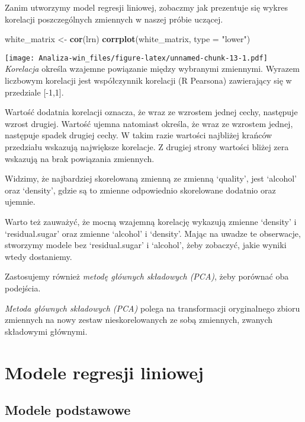 \documentclass[
]{article}
\newenvironment{Shaded}{\begin{snugshade}}{\end{snugshade}}
\newcommand{\AttributeTok}[1]{\textcolor[rgb]{0.13,0.29,0.53}{#1}}
\newcommand{\FunctionTok}[1]{\textcolor[rgb]{0.13,0.29,0.53}{\textbf{#1}}}
\newcommand{\NormalTok}[1]{#1}
\newcommand{\OtherTok}[1]{\textcolor[rgb]{0.56,0.35,0.01}{#1}}
\newcommand{\StringTok}[1]{\textcolor[rgb]{0.31,0.60,0.02}{#1}}
\begin{document}
Zanim utworzymy model regresji liniowej, zobaczmy jak prezentuje się
wykres korelacji poszczególnych zmiennych w naszej próbie uczącej.

\begin{Shaded}
\begin{Highlighting}[]
\NormalTok{white\_matrix }\OtherTok{\textless{}{-}} \FunctionTok{cor}\NormalTok{(lrn)}
\FunctionTok{corrplot}\NormalTok{(white\_matrix, }\AttributeTok{type =} \StringTok{"lower"}\NormalTok{)}
\end{Highlighting}
\end{Shaded}

\texttt{[image: Analiza-win\_files/figure-latex/unnamed-chunk-13-1.pdf]}
\emph{Korelacja} określa wzajemne powiązanie między wybranymi zmiennymi.
Wyrazem liczbowym korelacji jest współczynnik korelacji (R Pearsona)
zawierający się w przedziale {[}-1,1{]}.

Wartość dodatnia korelacji oznacza, że wraz ze wzrostem jednej cechy,
następuje wzrost drugiej. Wartość ujemna natomiast określa, że wraz ze
wzrostem jednej, następuje spadek drugiej cechy. W takim razie wartości
najbliżej krańców przedziału wskazują największe korelacje. Z drugiej
strony wartości bliżej zera wskazują na brak powiązania zmiennych.

Widzimy, że najbardziej skorelowaną zmienną ze zmienną `quality', jest
`alcohol' oraz `density', gdzie są to zmienne odpowiednio skorelowane
dodatnio oraz ujemnie.

Warto też zauważyć, że mocną wzajemną korelację wykazują zmienne
`density' i `residual.sugar' oraz zmienne `alcohol' i `density'. Mając
na uwadze te obserwacje, stworzymy modele bez `residual.sugar' i
`alcohol', żeby zobaczyć, jakie wyniki wtedy dostaniemy.

Zastosujemy również \emph{metodę głównych składowych (PCA)}, żeby
porównać oba podejścia.

\emph{Metoda głównych składowych (PCA)} polega na transformacji
oryginalnego zbioru zmiennych na nowy zestaw nieskorelowanych ze sobą
zmiennych, zwanych składowymi głównymi.

\section{Modele regresji liniowej}\label{modele-regresji-liniowej}

\subsection{Modele podstawowe}\label{modele-podstawowe}
\end{document}
